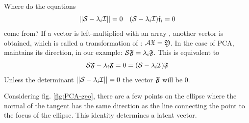 \begin{refsection}
Where do the equations
\begin{equation}
  ||\mathcal{S} - \lambda_i \mathcal{I}|| = 0 \quad (\mathcal{S} - \lambda_i \mathcal{I}) \mathfrak{f}_i = 0
\end{equation}
come from?  If a vector  is left-multiplied with an array , another vector  is
obtained, which is called a transformation of : \(\mathcal{A} \mathfrak{X} = \mathfrak{Y} \). In the case of PCA,
 maintains its direction, in our example: \( \mathcal{S} \mathfrak{F} = \lambda_i \mathfrak{F} \). This is equivalent
to
\begin{equation}
  \mathcal{S} \mathfrak{F} - \lambda_i \mathfrak{F} = 0 = (\mathcal{S} - \lambda_i \mathcal{I}) \mathfrak{F}
\end{equation}
Unless the determinant \(||\mathcal{S} - \lambda_i \mathcal{I}|| = 0 \) the vector \(\mathfrak{F} \) will be 0.

Considering fig. \ref{fig:PCA-geo}, there are a few points on the ellipse where the normal of the tangent has the
same direction as the line connecting the point to the focus of the ellipse. This identity determines a latent
vector.


\end{refsection}
